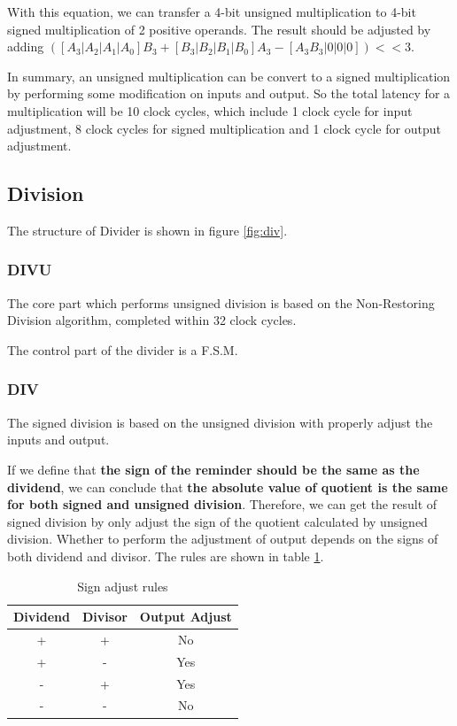 With this equation, we can transfer a 4-bit unsigned multiplication to 4-bit signed multiplication
of 2 positive operands. The result should be adjusted by adding $([A_3|A_2|A_1|A_0]B_3+[B_3|B_2|B_1|B_0]A_3-[A_3B_3|0|0|0]) << 3$.

In summary, an unsigned multiplication can be convert to a signed multiplication by
performing some modification on inputs and output. So the total latency for a multiplication
will be 10 clock cycles, which include 1 clock cycle for input adjustment, 8 clock cycles
for signed multiplication and 1 clock cycle for output adjustment.

\subsection[Division]{Division}
The structure of Divider is shown in figure \ref{fig:div}.

\subsubsection[DIVU]{DIVU}
The core part which performs unsigned division is based on the
Non-Restoring Division algorithm, completed within 32 clock cycles.

The control part of the divider is a F.S.M.

\subsubsection[DIV]{DIV}
The signed division is based on the unsigned division with properly adjust the inputs
and output.

If we define that {\bf the sign of the reminder should be the same as the dividend},
we can conclude that {\bf the absolute value of quotient is the same for both signed and
unsigned division}. Therefore, we can get the result of signed division by only adjust
the sign of the quotient calculated by unsigned division. Whether to perform the
adjustment of output depends on the signs of both dividend and divisor. The rules
are shown in table \ref{tab:div_sign}.

\begin{table}[!ht]
\centering
\caption{Sign adjust rules}
\label{tab:div_sign}
\begin{tabular}{|c|c|c|}
\hline
Dividend & Divisor & Output Adjust\\
\hline
+ & + & No\\
+ & - & Yes\\
- & + & Yes\\
- & - & No\\
\hline
\end{tabular}
\end{table}

